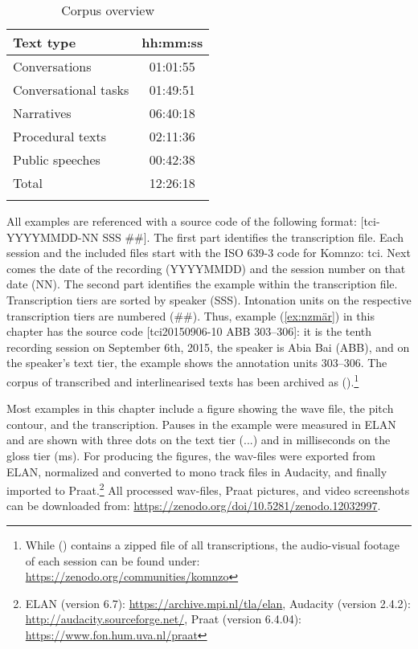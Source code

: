 \documentclass[output=paper,colorlinks,citecolor=brown]{langscibook}
\begin{document}
\begin{table}[H]
	\begin{tabular}{lc}
		\lsptoprule
		  Text type& hh:mm:ss\\
        \midrule
		  Conversations&01:01:55\\
		  Conversational tasks&01:49:51\\
		  Narratives&06:40:18\\
		  Procedural texts&02:11:36\\
		  Public speeches&00:42:38\\
        \midrule
		  Total&12:26:18\\
        \lspbottomrule
	\end{tabular}
	\caption{Corpus overview}	
	\label{tab:doehler:corpus}
\end{table}%

All examples are referenced with a source code of the following format: [tci-YYYYMMDD-NN SSS \#\#]. The first part identifies the transcription file. Each session and the included files start with the ISO 639-3 code for Komnzo: tci. Next comes the date of the recording (YYYYMMDD) and the session number on that date (NN). The second part identifies the example within the transcription file. Transcription tiers are sorted by speaker (SSS). Intonation units on the respective transcription tiers are numbered (\#\#). Thus, example (\ref{ex:nzmär}) in this chapter has the source code [tci20150906-10 ABB 303--306]: it is the tenth recording session on September 6th, 2015, the speaker is Abia Bai (ABB), and on the speaker's text tier, the example shows the annotation units 303--306. The corpus of transcribed and interlinearised texts has been archived as (\cite{Dohler:2020tx}).\footnote{While (\cite{Dohler:2020tx}) contains a zipped file of all transcriptions, the audio-visual footage of each session can be found under: \url{https://zenodo.org/communities/komnzo}}

Most examples in this chapter include a figure showing the wave file, the pitch contour, and the transcription. Pauses in the example were measured in ELAN and are shown with three dots on the text tier (...) and in milliseconds on the gloss tier (ms). For producing the figures, the wav-files were exported from ELAN,  normalized and converted to mono track files in Audacity, and finally imported to Praat.\footnote{ELAN (version 6.7): \url{https://archive.mpi.nl/tla/elan}, Audacity (version 2.4.2): \url{http://audacity.sourceforge.net/}, Praat (version 6.4.04): \url{https://www.fon.hum.uva.nl/praat}} All processed wav-files, Praat pictures, and video screenshots can be downloaded from: \url{https://zenodo.org/doi/10.5281/zenodo.12032997}.
\end{document}
